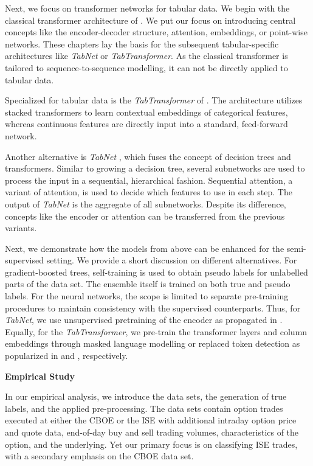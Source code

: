 Next, we focus on transformer networks for tabular data. We begin with the classical transformer architecture of \textcite{vaswaniAttentionAllYou2017}. We put our focus on introducing central concepts like the encoder-decoder structure, attention, embeddings, or point-wise networks. These chapters lay the basis for the subsequent tabular-specific architectures like \textit{TabNet} or \textit{TabTransformer}. As the classical transformer is tailored to sequence-to-sequence modelling, it can not be directly applied to tabular data.

Specialized for tabular data is the \textit{TabTransformer} of \textcite{huangTabTransformerTabularData2020}. The architecture utilizes stacked transformers to learn contextual embeddings of categorical features, whereas continuous features are directly input into a standard, feed-forward network.

Another alternative is \textit{TabNet} \autocite{arikTabNetAttentiveInterpretable2020}, which fuses the concept of decision trees and transformers. Similar to growing a decision tree, several subnetworks are used to process the input in a sequential, hierarchical fashion. Sequential attention, a variant of attention, is used to decide which features to use in each step. The output of \textit{TabNet} is the aggregate of all subnetworks. Despite its difference, concepts like the encoder or attention can be transferred from the previous variants. 

Next, we demonstrate how the models from above can be enhanced for the semi-supervised setting. We provide a short discussion on different alternatives. For gradient-boosted trees, self-training \autocite{yarowskyUnsupervisedWordSense1995} is used to obtain pseudo labels for unlabelled parts of the data set. The ensemble itself is trained on both true and pseudo labels. For the neural networks, the scope is limited to separate pre-training procedures to maintain consistency with the supervised counterparts. Thus, for \textit{TabNet}, we use unsupervised pretraining of the encoder as propagated in \textcite{arikTabNetAttentiveInterpretable2020}. Equally, for the \textit{TabTransformer}, we pre-train the transformer layers and column embeddings through masked language modelling or replaced token detection as popularized in \textcite{devlinBERTPretrainingDeep2019} and \textcite{clarkELECTRAPretrainingText2020}, respectively. 

\textbf{Empirical Study}

In our empirical analysis, we introduce the data sets, the generation of true labels, and the applied pre-processing. The data sets contain option trades executed at either the \gls{CBOE} or the \gls{ISE} with additional intraday option price and quote data, end-of-day buy and sell trading volumes, characteristics of the option, and the underlying. Yet our primary focus is on classifying \gls{ISE} trades, with a secondary emphasis on the \gls{CBOE} data set. 

